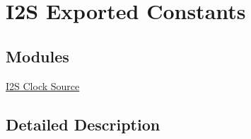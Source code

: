 \hypertarget{group___i2_s_ex___exported___constants}{}\section{I2S Exported Constants}
\label{group___i2_s_ex___exported___constants}
\subsection*{Modules}
\begin{DoxyCompactItemize}
\item 
\hyperlink{group___i2_s___clock___source}{I2\+S Clock Source}
\end{DoxyCompactItemize}


\subsection{Detailed Description}
